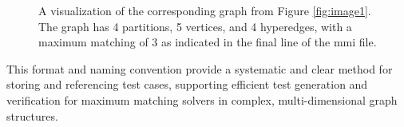 \begin{figure}[h!]
\begin{minipage}{0.45\textwidth}
        \caption{A visualization of the corresponding graph from Figure \ref{fig:image1}. The graph has 4 partitions, 5 vertices, and 4 hyperedges, with a maximum matching of 3 as indicated in the final line of the mmi file.}
        \label{fig:image2}
    \end{minipage}
\end{figure}

This format and naming convention provide a systematic and clear method for storing and referencing test cases, supporting efficient test generation and verification for maximum matching solvers in complex, multi-dimensional graph structures.